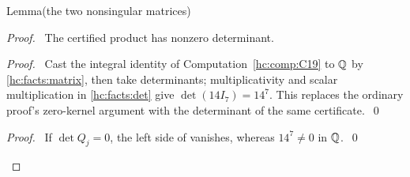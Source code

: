 \begin{mergedproofsection}
\begin{namedresult}{Lemma}{(the two nonsingular matrices)}\label{hc:lem:inverse}
 \leavevmode\par
\end{namedresult}
\begin{proof}
 \pfsketch\ The certified product has nonzero determinant.
 \begin{proof}\pf\ Cast the integral identity of
  Computation~\ref{hc:comp:C19} to ${\mathbb Q}$ by \ref{hc:facts:matrix},
  then take determinants;
  multiplicativity and scalar multiplication in \ref{hc:facts:det}
  give $\det(14I_7)=14^7$. This replaces the ordinary proof's
  zero-kernel argument with the determinant of the same certificate.~\qed\end{proof}
 \qedstep
 \begin{proof}\pf\ If $\det Q_j=0$, the left side of
   vanishes, whereas $14^7\ne0$ in ${\mathbb Q}$.~\qed\end{proof}
\end{proof}


\end{mergedproofsection}
